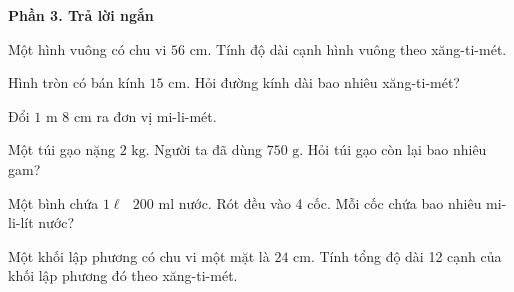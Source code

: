 \textbf{Phần 3. Trả lời ngắn}

\begin{ex} %
Một hình vuông có chu vi $56\text{ cm}$. Tính độ dài cạnh hình vuông theo xăng-ti-mét.
\end{ex}

\begin{ex} %
Hình tròn có bán kính $15\text{ cm}$. Hỏi đường kính dài bao nhiêu xăng-ti-mét?
\end{ex}

\begin{ex} %
Đổi $1\text{ m } 8\text{ cm}$ ra đơn vị mi-li-mét.
\end{ex}

\begin{ex} %
Một túi gạo nặng $2\text{ kg}$. Người ta đã dùng $750\text{ g}$. Hỏi túi gạo còn lại bao nhiêu gam?
\end{ex}

\begin{ex} %
Một bình chứa $1\ell\text{ }200\text{ ml}$ nước. Rót đều vào 4 cốc. Mỗi cốc chứa bao nhiêu mi-li-lít nước?
\end{ex}

\begin{ex} %
Một khối lập phương có chu vi một mặt là $24\text{ cm}$. Tính tổng độ dài 12 cạnh của khối lập phương đó theo xăng-ti-mét.
\end{ex}
